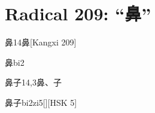
\section*{Radical 209: ``⿐''}

\begin{entry}{鼻}{14}{⿐}[Kangxi 209]
  \begin{phonetics}{鼻}{bi2}
  \end{phonetics}
\end{entry}

\begin{entry}{鼻子}{14,3}{⿐、⼦}
  \begin{phonetics}{鼻子}{bi2zi5}[][HSK 5]
  \end{phonetics}
\end{entry}


